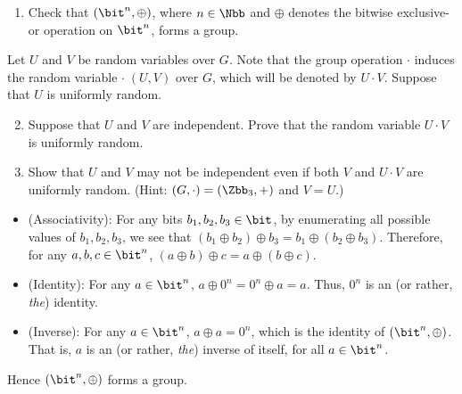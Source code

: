 \begin{problem}[Uniformity]\label{p1}
\leavevmode\par
\begin{enumerate}[label=(\roman*)]
    \item Check that $(\bit^n, \oplus)$, where $n\in\Nbb$ and $\oplus$ denotes the bitwise exclusive-or operation on $\bit^n$, forms a group.
\end{enumerate}
Let $U$ and $V$ be random variables over $G$. Note that the group operation $\cdot$ induces the random
variable $\cdot\;(U, V )$ over $G$, which will be denoted by $U \cdot  V$. Suppose that $U$ is uniformly random.
\begin{enumerate}[label=(\roman*)]
    \setcounter{enumi}{1}
    \item Suppose that $U$ and $V$ are independent. Prove that the random variable $U \cdot V$ is uniformly random.
    \item Show that $U$ and $V$ may not be independent even if both $V$ and $U \cdot V$ are uniformly random. (Hint: $(G, \cdot) = (\Zbb_3, +)$ and $V = U$.)
\end{enumerate}
\end{problem}




\begin{answer}[i]
    \leavevmode\par
    \begin{itemize}
        \item (Associativity): For any bits $b_1,b_2,b_3\in\bit$, by enumerating all possible values of $b_1,b_2,b_3$,  we see that $(b_1\oplus b_2)\oplus b_3= b_1\oplus(b_2\oplus b_3)$. Therefore, for any $a,b,c\in \bit^n$, $(a\oplus b)\oplus c= a\oplus(b\oplus c)$. 
        \item (Identity): For any $a\in \bit^n$, $a\oplus 0^n = 0^n\oplus a=a$. Thus, $0^n$ is an (or rather, \textit{the}) identity.
        \item (Inverse): For any $a\in\bit^n$, $a\oplus a=0^n$, which is the identity of $(\bit^n, \oplus)$. That is, $a$ is an (or rather, \textit{the}) inverse of itself, for all $a\in\bit^n$. 
    \end{itemize}
    Hence $(\bit^n, \oplus)$ forms a group.
\end{answer}

